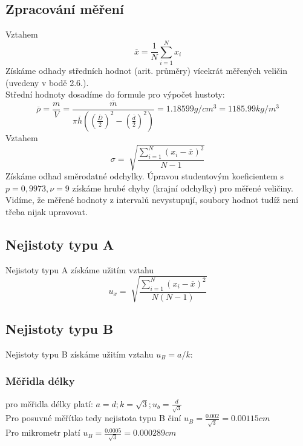 \documentclass[czech,11pt,a4paper]{article}
\begin{document}
	\subsection{Zpracování měření}
	Vztahem \begin{equation}
		\overline{x} = \frac{1}{N} \sum_{i=1}^{N} x_i
	\end{equation}
	Získáme odhady středních hodnot (arit. průměry) vícekrát měřených veličin (uvedeny v bodě 2.6.). \\
	Střední hodnoty dosadíme do formule pro výpočet hustoty:
	\begin{equation}
		\overline \rho = \frac m V = \frac{\overline m}{\pi \overline h ((\frac {\overline D} 2)^2 - (\frac {\overline{d}} 2)^2)} = 1.18599 g/cm^3 = 1 185.99 kg/m^3
	\end{equation}
	Vztahem
	\begin{equation}
		\sigma = \sqrt[]{\frac{\sum_{i =1}^N{ (x_i - \overline{x} )^2} }{N-1}}
	\end{equation}
	Získáme odhad směrodatné odchylky. Úpravou studentovým koeficientem s $p = 0,9973, \nu = 9$ získáme hrubé chyby (krajní odchylky) pro měřené veličiny.
    Vidíme, že měřené hodnoty z intervalů nevystupují, soubory hodnot tudíž není třeba nijak upravovat.	
	
	\subsection{Nejistoty typu A}
	Nejistoty typu A získáme užitím vztahu
	\begin{equation}
		u_x = \sqrt[]{\frac{\sum_{i =1}^N{ (x_i - \overline{x} )^2} }{N(N-1)}}
	\end{equation}
	
	\subsection{Nejistoty typu B}
	Nejistoty typu B získáme užitím vztahu $ u_B = a/k $:
	
	\subsubsection{Měřidla délky}
	pro měřidla délky platí: $a = d; k = \sqrt{3}; u_b = \frac{d}{\sqrt{3}}$ \\
	Pro posuvné měřítko tedy nejistota typu B činí $u_B = \frac {0.002}{ \sqrt{3}} = 0.00115 cm$ \\
	Pro mikrometr platí $u_B = \frac{0.0005}{\sqrt{3}} = 0.000289cm$
	
\end{document}
